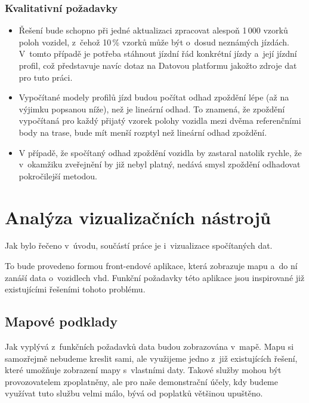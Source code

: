 \subsubsection{Kvalitativní požadavky} \label{subsubsection:kvalitativni_pozadavky}


\begin{itemize}

\item
Řešení bude schopno při jedné aktualizaci zpracovat alespoň 1\,000 vzorků poloh vozidel, z~čehož 10\,\% vzorků může být o~dosud neznámých jízdách. V~tomto případě je potřeba stáhnout jízdní řád konkrétní jízdy a~její jízdní profil, což představuje navíc dotaz na Datovou platformu jakožto zdroje dat pro tuto práci.

\item
Vypočítané modely profilů jízd budou počítat odhad zpoždění lépe (až na výjimku popsanou níže), než je lineární odhad. To znamená, že zpoždění vypočítaná pro každý přijatý vzorek polohy vozidla mezi dvěma referenčními body na trase, bude mít menší rozptyl než lineární odhad zpoždění.

\item
V případě, že spočítaný odhad zpoždění vozidla by zastaral natolik rychle, že v~okamžiku zveřejnění by již nebyl platný, nedává smysl zpoždění odhadovat pokročilejší metodou.


\end{itemize}

\section{Analýza vizualizačních nástrojů}

Jak bylo řečeno v~úvodu, součástí práce je i~vizualizace spočítaných dat.

\bigbreak

To bude provedeno formou front-endové aplikace, která zobrazuje mapu a~do ní zanáší data o~vozidlech \gls{vhd}. Funkční požadavky této aplikace jsou inspirované již existujícími řešeními tohoto problému.

\subsection{Mapové podklady}

Jak vyplývá z~funkčních požadavků data budou zobrazována v~mapě. Mapu si samozřejmě nebudeme kreslit sami, ale využijeme jedno z~již existujících řešení, které umožňuje zobrazení mapy s~vlastními daty. Takové služby mohou být provozovatelem zpoplatněny, ale pro naše demonstrační účely, kdy budeme využívat tuto službu velmi málo, bývá od poplatků většinou upuštěno.

